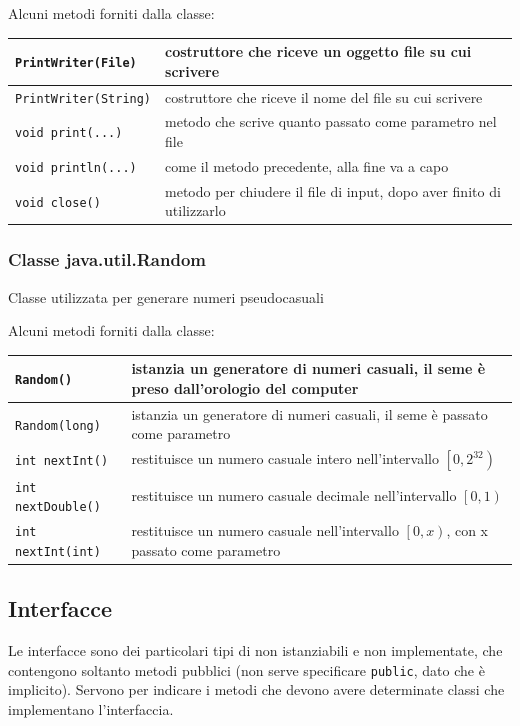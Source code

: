 \documentclass{article}
\begin{document}
Alcuni metodi forniti dalla classe:
\begin{center}
	\begin{tabularx}{\textwidth}{l X}
		\toprule
		\verb|PrintWriter(File)| & costruttore che riceve un oggetto file su cui scrivere \\
		\midrule
		\verb|PrintWriter(String)| & costruttore che riceve il nome del file su cui scrivere \\
		\midrule
		\verb|void print(...)| & metodo che scrive quanto passato come parametro nel file \\
		\midrule
		\verb|void println(...)| & come il metodo precedente, alla fine va a capo \\
		\midrule
		\verb|void close()| & metodo per chiudere il file di input, dopo aver finito di utilizzarlo \\
		\bottomrule
	\end{tabularx}
\end{center}

\subsubsection*{Classe java.util.Random}
Classe utilizzata per generare numeri pseudocasuali

Alcuni metodi forniti dalla classe:
\begin{center}
	\begin{tabularx}{\textwidth}{l X}
		\toprule
		\verb|Random()| & istanzia un generatore di numeri casuali, il seme è preso dall'orologio del computer \\
		\midrule
		\verb|Random(long)| & istanzia un generatore di numeri casuali, il seme è passato come parametro \\
		\midrule
		\verb|int nextInt()| & restituisce un numero casuale intero nell'intervallo \(\left[0, 2^{32}\right)\) \\
		\midrule
		\verb|int nextDouble()| & restituisce un numero casuale decimale nell'intervallo \(\left[0, 1\right)\)\\
		\midrule
		\verb|int nextInt(int)| & restituisce un numero casuale nell'intervallo \(\left[0, x\right)\), con x passato come parametro \\
		\bottomrule
	\end{tabularx}
\end{center}

\subsection{Interfacce}
Le interfacce sono dei particolari tipi di  non istanziabili e non implementate, che contengono soltanto
metodi pubblici (non serve specificare \verb|public|, dato che è implicito). Servono per indicare i metodi che devono
avere determinate classi che implementano l'interfaccia.
\end{document}
